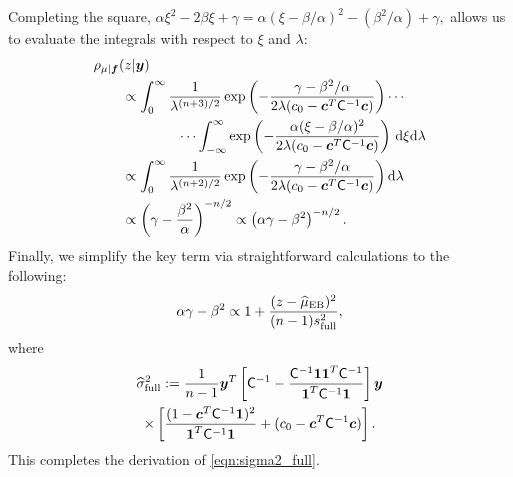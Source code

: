 \documentclass[twocolumn]{svjour3}          %
\newcommand{\bm}[1]{\boldsymbol{#1}}
\newcommand{\D}[1]{\text{d}{#1}}
\newcommand{\vc}{\bm{c}}
\newcommand{\vf}{\bm{f}}
\newcommand{\vy}{\bm{y}}
\newcommand{\vone}{\bm{1}}
\newcommand{\mC}{\mathsf{C}}
\newcommand{\hmu}{\widehat{\mu}}
\newcommand{\hsigma}{\widehat{\sigma}}
\newcommand{\MLE}{\textup{EB}}
\begin{document}
\begin{appendices}
Completing the square, $
\alpha \xi^2 -2 \beta \xi + \gamma 
= \alpha (\xi -\beta/\alpha)^2  - (\beta^2/\alpha) + \gamma,
$
allows us to evaluate the integrals with respect to $\xi$ and $\lambda$:
\begin{align*}
\MoveEqLeft{\rho_{\mu|\vf}(z | \vy)} \\
& \propto \displaystyle \int_{0}^\infty  \frac{1}{\lambda^{(n+3)/2}}  \exp\left( -\frac{  \gamma - \beta^2/\alpha}{2\lambda(c_0  -\vc ^T \mC^{-1} \vc)} \right)  \cdots \\
& \qquad \qquad \cdots \int_{-\infty}^\infty  \exp\left( -\frac{\alpha (\xi -\beta/\alpha)^2}{2\lambda(c_0  -\vc ^T \mC^{-1} \vc)} \right) \, \D \xi \D \lambda \\
& \propto \displaystyle \int_{0}^\infty  \frac{1}{\lambda^{(n+2)/2}}  \exp\left( -\frac{  \gamma - \beta^2/\alpha}{2\lambda(c_0  -\vc ^T \mC^{-1} \vc)} \right) \D \lambda \\
& \propto \left(\gamma - \frac{\beta^2}{\alpha}\right)^{-n/2} \propto \left(\alpha \gamma - \beta^2\right)^{-n/2}.
\end{align*}
Finally, we simplify the key term via straightforward calculations to the following:
\begin{align*}
\alpha \gamma - \beta^2 \propto 1 +  \frac{(z - \hmu_{\MLE})^2}{(n-1)s_{\textup{full}}^2},
\end{align*}
where 
\begin{multline*}
\hsigma_{\textup{full}}^2
:= \frac{1}{n-1}
\vy^T\left[ \mC^{-1} 
- \frac{ \mC^{-1} \vone\vone^T \mC^{-1}}{\vone^T \mC^{-1} \vone}  \right]\vy
\\ 
\times  \left[\frac{(1 - \vc^T \mC^{-1} \vone)^2}{\vone^T \mC^{-1} \vone} + (c_0  -\vc ^T \mC^{-1} \vc) \right].
\end{multline*}
This completes the derivation of \eqref{eqn:sigma2_full}.
\end{appendices}

\end{document}
